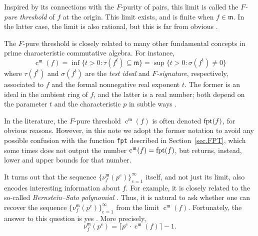 \documentclass{amsart}
\newcommand{\ft}{\operatorname{c}}
\newcommand{\idealm}{\mathfrak{m}}
\begin{document}
Inspired by its connections with the $F$-purity of pairs,  this limit is called the \emph{$F$-pure threshold} of $f$ at the origin.  This limit exists, and is finite when $f \in \idealm$.  In the latter case, the limit is also rational, but this is far from obvious  \cite{BlickleMustataSmithDiscretenessAndRationalityOfFThresholds}.

The $F$-pure threshold is closely related to many other fundamental concepts in prime characteristic commutative algebra.   For instance,
\[ \ft^{\idealm}(f) = \inf \{ t>0 : \tau(f^t)  \subseteq \idealm \} = \sup \{ t>0 : \sigma( f^t) \neq 0 \} \]
where $\tau(f^t)$ and $\sigma(f^t)$ are the \emph{test ideal} and \emph{$F$-signature}, respectively, associated to $f$ and the formal nonnegative real exponent $t$.  The former is an ideal in the ambient ring of $f$, and the latter is a real number;  both depend on the parameter $t$ and the characteristic $p$ in subtle ways \cite{BlickleMustataSmithDiscretenessAndRationalityOfFThresholds, BlickleSchwedeTuckerFSigPairs1}.

In the literature, the $F$-pure threshold $\ft^{\idealm}(f)$ is often denoted $\operatorname{{fpt}}(f)$, for obvious reasons.
However, in this note we adopt the former notation to avoid any possible confusion with the function \texttt{fpt} described in Section~\ref{sec.FPT}, which some times does not output the number $\ft^{\idealm}(f) = \fpt(f)$, but returns, instead, lower and upper bounds for that number.

It turns out that the sequence $\{ \nu_f^{\idealm}(p^e) \}_{e=1}^{\infty}$ itself, and not just its limit, also encodes interesting information about $f$.  For example, it is closely related to the so-called \emph{Bernstein--Sato polynomial} \cite{MustataTakagiWatanabeFThresholdsAndBernsteinSato}.  Thus, it is natural to ask whether one can recover the sequence $\{ \nu_f^{\idealm}(p^e) \}_{e=1}^{\infty}$ from the limit $\ft^{\idealm}(f)$.  Fortunately, the answer to this question is yes \cite{MustataTakagiWatanabeFThresholdsAndBernsteinSato, HernandezFPurityOfHypersurfaces}. More precisely,
\begin{equation*}
\nu_f^{\idealm}(p^e) = \lceil p^e \cdot \ft^{\idealm}(f) \rceil - 1.
\end{equation*}
\end{document}
